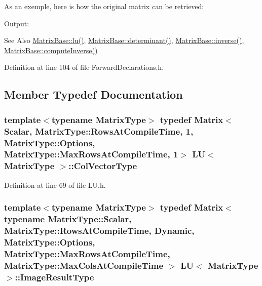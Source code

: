 As an exemple, here is how the original matrix can be retrieved\-: 
\begin{DoxyCodeInclude}
\end{DoxyCodeInclude}
 Output\-:
\begin{DoxyVerbInclude}
\end{DoxyVerbInclude}


\begin{DoxySeeAlso}{See Also}
\hyperlink{class_matrix_base_a8ec83738a46f2a13e6d878726e289116}{Matrix\-Base\-::lu()}, \hyperlink{class_matrix_base_a575c602e776b302104919a8bf3094178}{Matrix\-Base\-::determinant()}, \hyperlink{class_matrix_base_a27c44883ab6a4828bcae0c8bf8c4a958}{Matrix\-Base\-::inverse()}, \hyperlink{class_matrix_base_a6c2b95ebe2784c06eb8020918519b3e4}{Matrix\-Base\-::compute\-Inverse()} 
\end{DoxySeeAlso}


Definition at line 104 of file Forward\-Declarations.\-h.



\subsection{Member Typedef Documentation}
\hypertarget{class_l_u_affc6f0ec6472f4868698a066be969111}{
\subsubsection[{Col\-Vector\-Type}]{\setlength{\rightskip}{0pt plus 5cm}template$<$typename Matrix\-Type$>$ typedef {\bf Matrix}$<${\bf Scalar}, Matrix\-Type\-::\-Rows\-At\-Compile\-Time, 1, Matrix\-Type\-::\-Options, Matrix\-Type\-::\-Max\-Rows\-At\-Compile\-Time, 1$>$ {\bf L\-U}$<$ Matrix\-Type $>$\-::{\bf Col\-Vector\-Type}}}\label{class_l_u_affc6f0ec6472f4868698a066be969111}


Definition at line 69 of file L\-U.\-h.

\hypertarget{class_l_u_a0c18d8a15aeec09772ef473875c03b2b}{
\subsubsection[{Image\-Result\-Type}]{\setlength{\rightskip}{0pt plus 5cm}template$<$typename Matrix\-Type$>$ typedef {\bf Matrix}$<$typename Matrix\-Type\-::\-Scalar, Matrix\-Type\-::\-Rows\-At\-Compile\-Time, {\bf Dynamic}, Matrix\-Type\-::\-Options, Matrix\-Type\-::\-Max\-Rows\-At\-Compile\-Time, Matrix\-Type\-::\-Max\-Cols\-At\-Compile\-Time $>$ {\bf L\-U}$<$ Matrix\-Type $>$\-::{\bf Image\-Result\-Type}}}\label{class_l_u_a0c18d8a15aeec09772ef473875c03b2b}


